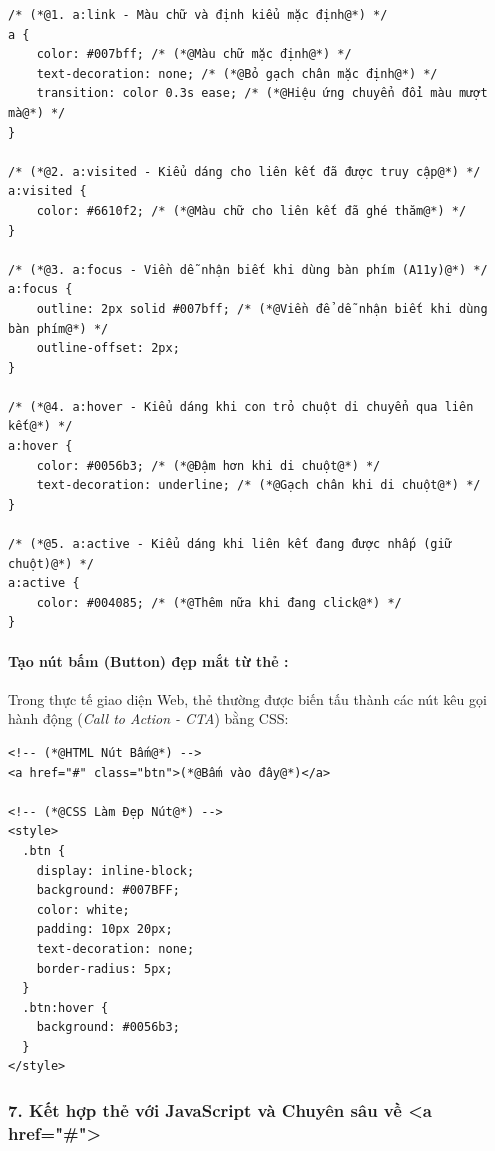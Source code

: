 \begin{codeWindow}
\begin{lstlisting}[language=HTML5]
/* (*@1. a:link - Màu chữ và định kiểu mặc định@*) */
a {
    color: #007bff; /* (*@Màu chữ mặc định@*) */
    text-decoration: none; /* (*@Bỏ gạch chân mặc định@*) */
    transition: color 0.3s ease; /* (*@Hiệu ứng chuyển đổi màu mượt mà@*) */
}

/* (*@2. a:visited - Kiểu dáng cho liên kết đã được truy cập@*) */
a:visited {
    color: #6610f2; /* (*@Màu chữ cho liên kết đã ghé thăm@*) */
}

/* (*@3. a:focus - Viền dễ nhận biết khi dùng bàn phím (A11y)@*) */
a:focus {
    outline: 2px solid #007bff; /* (*@Viền để dễ nhận biết khi dùng bàn phím@*) */
    outline-offset: 2px;
}

/* (*@4. a:hover - Kiểu dáng khi con trỏ chuột di chuyển qua liên kết@*) */
a:hover {
    color: #0056b3; /* (*@Đậm hơn khi di chuột@*) */
    text-decoration: underline; /* (*@Gạch chân khi di chuột@*) */
}

/* (*@5. a:active - Kiểu dáng khi liên kết đang được nhấp (giữ chuột)@*) */
a:active {
    color: #004085; /* (*@Thêm nữa khi đang click@*) */
}
\end{lstlisting}
\end{codeWindow}

\paragraph{Tạo nút bấm (Button) đẹp mắt từ thẻ :}
Trong thực tế giao diện Web, thẻ  thường được biến tấu thành các nút kêu gọi hành động (\textit{Call to Action - CTA}) bằng CSS:

\begin{codeWindow}
\begin{lstlisting}[language=HTML5]
<!-- (*@HTML Nút Bấm@*) -->
<a href="#" class="btn">(*@Bấm vào đây@*)</a>

<!-- (*@CSS Làm Đẹp Nút@*) -->
<style>
  .btn {
    display: inline-block;
    background: #007BFF;
    color: white;
    padding: 10px 20px;
    text-decoration: none;
    border-radius: 5px;
  }
  .btn:hover {
    background: #0056b3;
  }
</style>
\end{lstlisting}
\end{codeWindow}

\subsubsection{7. Kết hợp thẻ  với JavaScript và Chuyên sâu về <a href="\#">}


